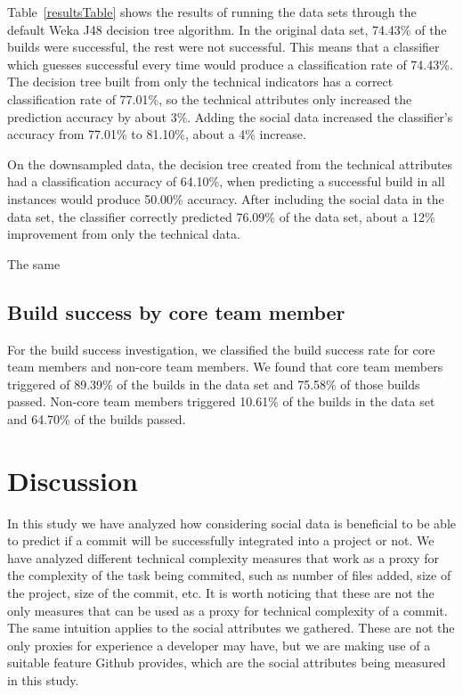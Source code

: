 \documentclass[10pt, conference]{IEEEtran}
\begin{document}
Table~\ref{resultsTable} shows the results of running the data sets through the
default Weka J48 decision tree algorithm. 
In the original data set, 74.43\% of the builds were successful, the rest were not
successful.  This means that a classifier which guesses successful every time
would produce a classification rate of 74.43\%. The decision tree built from
only the technical indicators has a correct classification rate of 77.01\%, so
the technical attributes only increased the prediction accuracy by about 3\%.
Adding the social data increased the classifier's accuracy from 77.01\% to
81.10\%, about a 4\% increase.  

On the downsampled data, the decision tree created from the technical attributes
had a classification accuracy of 64.10\%, when predicting a successful build in
all instances would produce 50.00\% accuracy.  After including the social data
in the data set, the classifier correctly predicted 76.09\% of the data set,
about a 12\% improvement from only the technical data.

The same

\subsection{Build success by core team member}

For the build success investigation, we classified the build success rate for
core team members and non-core team members.  We found that core team members
triggered of 89.39\% of the builds in the data set and 75.58\% of those builds
passed.  Non-core team members triggered 10.61\% of the builds in the data set
and 64.70\% of the builds passed.






\section{Discussion}
In this study we have analyzed how considering social data is beneficial to be able to predict if a commit will be successfully integrated into a project or not. We have analyzed different technical complexity measures that work as a proxy for the complexity of the task being commited, such as number of files added, size of the project, size of the commit, etc. It is worth noticing that these are not the only measures that can be used as a proxy for technical complexity of a commit. The same intuition applies to the social attributes we gathered. These are not the only proxies for experience a developer may have, but we are making use of a suitable feature Github provides, which are the social attributes being measured in this study. 
\end{document}
